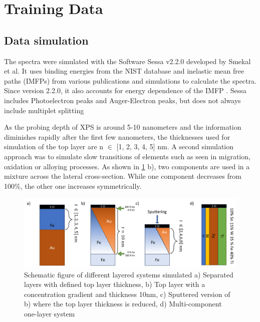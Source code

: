 

\section{Training Data}
\label{train_data}


\subsection{Data simulation}

The spectra were simulated with the Software Sessa v2.2.0 developed by Smekal et al. It uses binding energies from the NIST database and inelastic mean free paths (IMFPs) from various publications and simulations to calculate the spectra. Since version 2.2.0, it also accounts for energy dependence of the IMFP \cite{noauthor_nist_2010}.
Sessa includes Photoelectron peaks and Auger-Electron peaks, but does not always include multiplet splitting 

As the probing depth of XPS is around 5-10 nanometers and the information diminishes rapidly after the first few nanometers, the thicknesses used for simulation of the top layer are n $\in$ [1, 2, 3, 4, 5] nm. A second simulation approach was to simulate slow transitions of elements such as seen in migration, oxidation or alloying processes. As shown in \ref{fig:layers} b), two components are used in a mixture across the lateral cross-section. While one component decreases from 100\%, the other one increases symmetrically.

\begin{figure}
    \centering
    \includegraphics[width=\textwidth]{Figures/layers.png}
    \caption{Schematic figure of different layered systems simulated a) Separated layers with defined top layer thickness, b) Top layer with a concentration gradient and thickness 10nm, c) Sputtered version of b) where the top layer thickness is reduced, d) Multi-component one-layer system}
    \label{fig:layers}
\end{figure}


